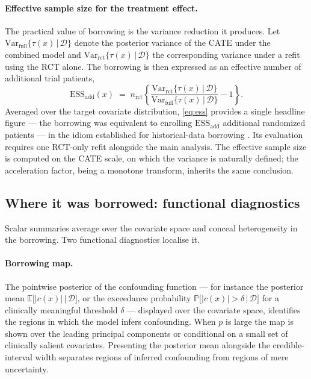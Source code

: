 \documentclass[11pt]{report}
\theoremstyle{plain}
\theoremstyle{definition}
\theoremstyle{remark}
\newcommand{\E}{\mathbb{E}}
\newcommand{\1}{\mathds{1}}
\theoremstyle{plain}
\theoremstyle{remark}
\newcommand{\Var}{\mathrm{Var}}
\newcommand{\Prob}{\mathbb{P}}
\newcommand{\given}{\,\vert\,}
\newcommand{\data}{\mathcal{D}}
\begin{document}
\paragraph{Effective sample size for the treatment effect.}
The practical value of borrowing is the variance reduction it produces. Let
$\Var_{\text{full}}\{\tau(x) \given \data\}$ denote the posterior variance of
the CATE under the combined model and $\Var_{\text{rct}}\{\tau(x) \given \data\}$
the corresponding variance under a refit using the RCT alone. The borrowing is
then expressed as an effective number of additional trial patients,
\begin{equation}
\label{eq:ess}
\mathrm{ESS}_{\text{add}}(x)
  \;=\; n_{\text{rct}}
  \left\{
  \frac{\Var_{\text{rct}}\{\tau(x) \given \data\}}
       {\Var_{\text{full}}\{\tau(x) \given \data\}} - 1
  \right\}.
\end{equation}
Averaged over the target covariate distribution, \eqref{eq:ess} provides a
single headline figure --- the borrowing was equivalent to enrolling
$\mathrm{ESS}_{\text{add}}$ additional randomized patients --- in the idiom
established for historical-data borrowing
\citep{neuenschwander2010,hupf2021bayesian}. Its evaluation requires one RCT-only refit
alongside the main analysis. The effective sample size is computed on the CATE
scale, on which the variance is naturally defined; the acceleration factor,
being a monotone transform, inherits the same conclusion.

\subsection{Where it was borrowed: functional diagnostics}

Scalar summaries average over the covariate space and conceal heterogeneity in
the borrowing. Two functional diagnostics localise it.

\paragraph{Borrowing map.}
The pointwise posterior of the confounding function --- for instance the
posterior mean $\E\bigl[|c(x)| \given \data\bigr]$, or the exceedance
probability $\Prob\bigl[|c(x)| > \delta \given \data\bigr]$ for a clinically
meaningful threshold $\delta$ --- displayed over the covariate space, identifies
the regions in which the model infers confounding. When $p$ is large the map is
shown over the leading principal components or conditional on a small set of
clinically salient covariates. Presenting the posterior mean alongside the
credible-interval width separates regions of inferred confounding from regions
of mere uncertainty.
\end{document}
